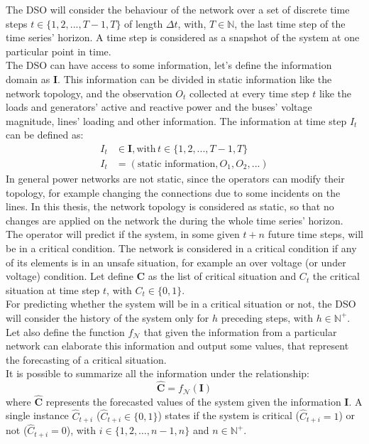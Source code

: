 The \gls{DSO} will consider the behaviour of the network over a set of discrete time steps $t \in \{1,2,...,T-1,T\}$ of length $\Delta t$, with, $T \in \mathbb{N}$, the last time step of the time series’ horizon. A time step is considered as a snapshot of the system at one particular point in time. \\ 

The \gls{DSO} can have access to some information, let's define the information domain as $\textbf{I}$. This information can be divided in static information like the network topology, and the observation $O_t$ collected at every time step $t$ like the loads and generators' active and reactive power and the buses' voltage magnitude, lines' loading and other information. The information at time step $I_t$ can be defined as:
\begin{align*}
    I_t & \in \textbf{I}, \text{with} \, t \in \{1,2,...,T-1,T\} \\
    I_t & = (\text{static information}, O_1, O_2, ...)
\end{align*}
\noindent In general power networks are not static, since the operators can modify their topology, for example changing the connections due to some incidents on the lines. In this thesis, the network topology is considered as static, so that no changes are applied on the network the during the whole time series' horizon.\\

The operator will predict if the system, in some given $t+n$ future time steps, will be in a critical condition. The network is considered in a critical condition if any of its elements is in an unsafe situation, for example an over voltage (or under voltage) condition. Let define $\textbf{C}$ as the list of critical situation and $C_t$ the critical situation at time step $t$, with $C_t \in \{0,1\}$.  \\
For predicting whether the system will be in a critical situation or not, the \gls{DSO} will consider the history of the system only for $h$ preceding steps, with $h \in \mathbb{N}^+$. \\

Let also define the function $f_\mathcal{N}$ that given the information from a particular network can elaborate this information and output some values, that represent the forecasting of a critical situation. \\
It is possible to summarize all the information under the relationship:
\begin{equation} \label{eq:fmapping}
    \hat{\textbf{C}} = f_\mathcal{N}(\textbf{I})
\end{equation}
\noindent where $\hat{\textbf{C}}$ represents the forecasted values of the system given the information $\textbf{I}$. A single instance $\hat{C}_{t+i}$ ($\hat{C}_{t+i} \in \{0,1\}$) states if the system is critical ($\hat{C}_{t+i}=1$) or not ($\hat{C}_{t+i}=0$), with $i \in \{1,2,\dots,n-1,n\}$ and $n \in \mathbb{N}^+$. \\

